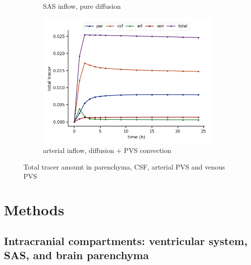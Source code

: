 \documentclass[fleqn,10pt]{wlscirep}
\newcommand{\mer}[1]{\textcolor{magenta}{#1}}
\begin{document}
\begin{figure}
\begin{subfigure}[b]{0.33\textwidth}
         \caption{SAS inflow, pure diffusion}
         \label{fig:three sin x}
     \end{subfigure}
     \hfill
     \begin{subfigure}[b]{0.33\textwidth}
         \centering
         \includegraphics[width=\textwidth]{modelC_total_conc.png}
         \caption{arterial inflow, diffusion + PVS convection}
         \label{fig:five over x}
     \end{subfigure}
        \caption{Total tracer amount in parenchyma, CSF, arterial PVS and venous PVS}
        \label{fig:three graphs}
\end{figure}

\fi

\newpage
\section*{Methods}


\subsection*{Intracranial compartments: ventricular system, SAS, and brain parenchyma}
\end{document}
